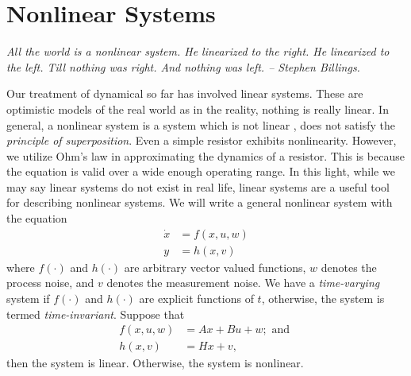 \section{Nonlinear Systems}

\textit{All the world is a nonlinear system. He linearized to the right. He linearized to the left. Till nothing was right. And nothing was left. -- Stephen Billings.}

Our treatment of dynamical so far has involved linear systems. These are optimistic models of the real world as in the reality, nothing is really linear. In general, a nonlinear system is a system which is not linear \ie, does not satisfy the \textit{principle of superposition}. Even a simple resistor exhibits nonlinearity. However, we utilize Ohm's law in approximating the dynamics of a resistor. This is because the equation is valid over a wide enough operating range. In this light, while we may say linear systems do not exist in real life, linear systems are a useful tool for describing nonlinear systems. We will write a general nonlinear system with the equation
%
\begin{align}
	\dot{x} &= f(x, u, w) \nonumber \\
	y &= h(x, v)
	\label{eq:nlnr}
\end{align}
%
where $f(\cdot)$ and $h(\cdot)$ are arbitrary vector valued functions, $w$ denotes the process noise, and $v$ denotes the measurement noise. We have a \textit{time-varying} system if $f(\cdot)$ and $h(\cdot)$ are explicit functions of $t$, otherwise, the system is termed \textit{time-invariant}. Suppose that %
\begin{align}
	f(x, u, w) &= Ax + Bu + w; \text{  and  } \\
	 h(x,v) &= Hx + v,
\end{align}
%
then the system is linear. Otherwise, the system is nonlinear.

